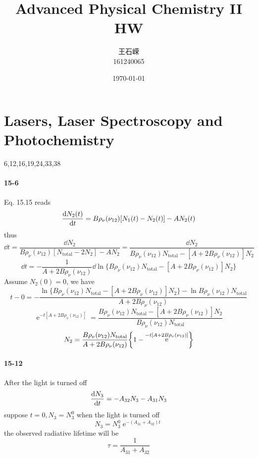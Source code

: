 \documentclass[a4paper]{article}
\title{\textbf{Advanced Physical Chemistry II}\\HW}
\author{王石嵘
\vspace{5pt}\\
161240065\\
}
\date{\today} %
\DeclareMathOperator{\e}{\mathrm{e}}
\newcommand{\ex}[1]{\paragraph{15-#1}}
\numberwithin{equation}{section}
\begin{document}

\maketitle



\setcounter{section}{14}
\section{Lasers, Laser Spectroscopy and Photochemistry}
6,12,16,19,24,33,38\\
\ex{6}
Eq. 15.15 reads
\begin{equation}\label{key}
\dv{N_2(t)}{t} = B\rho_\nu(\nu_{12})[N_1(t) - N_2(t)] - A N_2(t)
\end{equation}
thus
\begin{equation}\label{key}
\dd t = \dfrac{\dd N_2}{B\rho_\nu(\nu_{12})[N_{\text{total}} - 2N_2] - A N_2} = \dfrac{\dd N_2}{B\rho_\nu(\nu_{12})N_{\text{total}} - [A + 2B\rho_\nu(\nu_{12})]N_2}
\end{equation}
\begin{equation}\label{key}
\dd t = -\dfrac{1}{A + 2B\rho_\nu(\nu_{12})} \dd\ln\{B\rho_\nu(\nu_{12})N_{\text{total}} - [A + 2B\rho_\nu(\nu_{12})]N_2\}
\end{equation}
Assume $ N_2(0) = 0 $, we have
\begin{equation}\label{key}
t - 0 = -\dfrac{\ln\{B\rho_\nu(\nu_{12})N_{\text{total}} - [A + 2B\rho_\nu(\nu_{12})]N_2\} - \ln B\rho_\nu(\nu_{12})N_{\text{total}}}{A + 2B\rho_\nu(\nu_{12})}  
\end{equation}
\begin{equation}\label{key}
\e^{-t[A + 2B\rho_\nu(\nu_{12})]} =  \dfrac{B\rho_\nu(\nu_{12})N_{\text{total}} - [A + 2B\rho_\nu(\nu_{12})]N_2}{B\rho_\nu(\nu_{12})N_{\text{total}}}
\end{equation}
\begin{equation}\label{key}
N_2 = \dfrac{B\rho_\nu(\nu_{12})N_{\text{total}}}{A + 2B\rho_\nu(\nu_{12})} \qty{1 - \e^{-t[A + 2B\rho_\nu(\nu_{12})]}}
\end{equation}

\ex{12}
After the light is turned off
\begin{equation}\label{key}
\dv{N_3}{t} = -A_{32}N_3 - A_{31}N_3
\end{equation}
suppose $ t=0, N_3 = N_3^0$ when the light is turned off
\begin{equation}\label{key}
N_3 = N_3^0\e^{-(A_{31}+A_{32})t}
\end{equation}
the observed radiative lifetime will be
\begin{equation}\label{key}
\tau = \dfrac{1}{A_{31}+A_{32}}
\end{equation}
\end{document}
